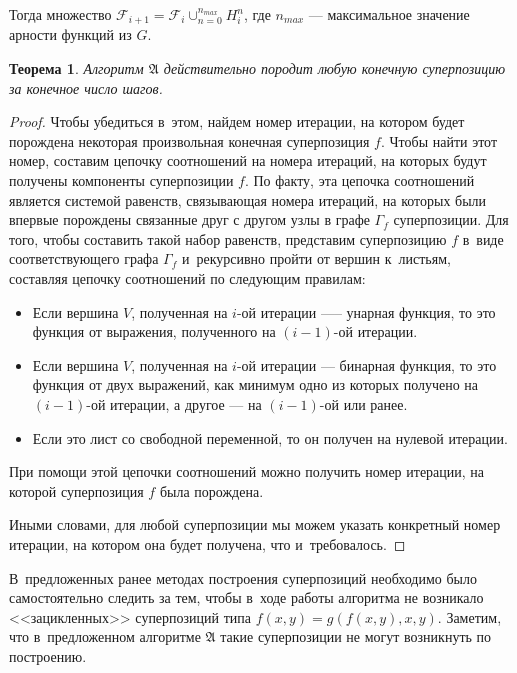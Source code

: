 \documentclass[12pt,a4paper]{amsart}
\newtheorem{theorem}{Теорема}
\begin{document}
Тогда множество $\mathcal{F}_{i+1} = \mathcal{F}_i \cup_{n=0}^{n_{max}} H_i^n$,
где $n_{max}$ --- максимальное значение арности функций из $G$.

\begin{theorem}
  Алгоритм $\mathfrak{A}$ действительно породит любую конечную суперпозицию
  за конечное число шагов.
\end{theorem}
\begin{proof}
  Чтобы убедиться в~этом, найдем номер итерации, на котором будет порождена
  некоторая произвольная конечная суперпозиция $f$. Чтобы найти этот номер,
  составим цепочку соотношений на номера итераций, на которых будут получены
  компоненты суперпозиции $f$. По факту, эта цепочка соотношений является
  системой равенств, связывающая номера итераций, на которых были впервые
  порождены связанные друг с другом узлы в графе $\Gamma_f$ суперпозиции.
  Для того, чтобы составить такой набор равенств, представим суперпозицию
  $f$ в~виде соответствующего графа $\Gamma_f$ и~рекурсивно пройти от вершин
  к~листьям, составляя цепочку соотношений по следующим правилам:

  \begin{itemize}
	\item Если вершина $V$, полученная на $i$-ой итерации —-- унарная функция,
	  то это функция от выражения, полученного на $(i-1)$-ой итерации.
	\item Если вершина $V$, полученная на $i$-ой итерации --- бинарная функция,
	  то это функция от двух выражений, как минимум одно из которых получено
	  на $(i-1)$-ой итерации, а другое --- на $(i-1)$-ой или ранее.
	\item Если это лист со свободной переменной, то он получен на нулевой
	  итерации.
  \end{itemize}

  При помощи этой цепочки соотношений можно получить номер итерации, на
  которой суперпозиция $f$ была порождена.
  
  Иными словами, для любой суперпозиции мы можем указать конкретный номер
  итерации, на котором она будет получена, что и~требовалось.
\end{proof}

В~предложенных ранее методах\cite{Zelinka2008} построения суперпозиций
необходимо было самостоятельно следить за тем, чтобы в~ходе работы алгоритма
не возникало <<зацикленных>> суперпозиций типа $f(x, y) = g (f(x, y), x, y)$.
Заметим, что в~предложенном алгоритме $\mathfrak{A}$ такие суперпозиции
не могут возникнуть по построению.
\end{document}
